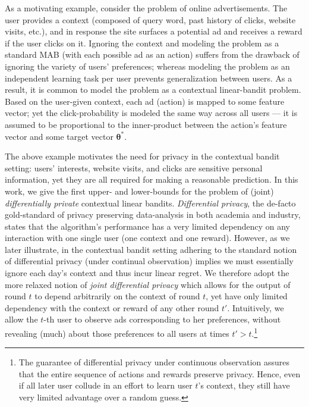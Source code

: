 \documentclass{article}
\renewcommand{\vec}[1]{\bm{#1}}
\begin{document}

As a motivating example, consider the problem of online
advertisements.  The user provides a context (composed of query word,
past history of clicks, website visits, etc.), and in response the
site surfaces a potential ad and receives a reward if the user clicks
on it.  Ignoring the context and modeling the problem as a standard
MAB (with each possible ad as an action) suffers from the drawback of
ignoring the variety of users' preferences; whereas modeling the
problem as an independent learning task per user prevents
generalization between users.  As a result, it is common to model the
problem as a contextual linear-bandit problem.  Based on the
user-given context, each ad (action) is mapped to some feature vector;
yet the click-probability is modeled the same way across all users ---
it is assumed to be proportional to the inner-product between the
action's feature vector and some target vector $\vec\theta^*$.

The above example motivates the need for privacy in the contextual bandit setting: users' interests, website visits, and clicks are
sensitive personal information, yet they are all required for making a reasonable prediction.
In this work, we give the first upper- and lower-bounds for the
problem of (joint) \emph{differentially private} contextual linear
bandits.
\emph{Differential privacy}, the de-facto gold-standard of
privacy preserving data-analysis in both academia and industry,
states that the algorithm's performance has a very limited dependency on any interaction with one single user (one context and one
reward).  However, as we later illustrate, in the contextual
bandit setting adhering to the standard notion of differential privacy (under continual observation) implies we must essentially ignore
each day's context and thus incur linear regret.  We therefore adopt
the more relaxed notion of \emph{joint differential privacy}
\citep{KearnsMechanismDesign2014} which allows for the output of round
$t$ to depend arbitrarily on the context of round $t$, yet have only
limited dependency with the context or reward of any other round
$t'$.  Intuitively, we allow the $t$-th user to observe ads
corresponding to her preferences, without revealing (much) about those
preferences to all users at times $t'>t$.\footnote{The guarantee of
  differential privacy under continuous observation assures that the
  entire sequence of actions and rewards preserve privacy.  Hence, even
  if all later user collude in an effort to learn user $t$'s context,
  they still have very limited advantage over a random guess.}
\end{document}

